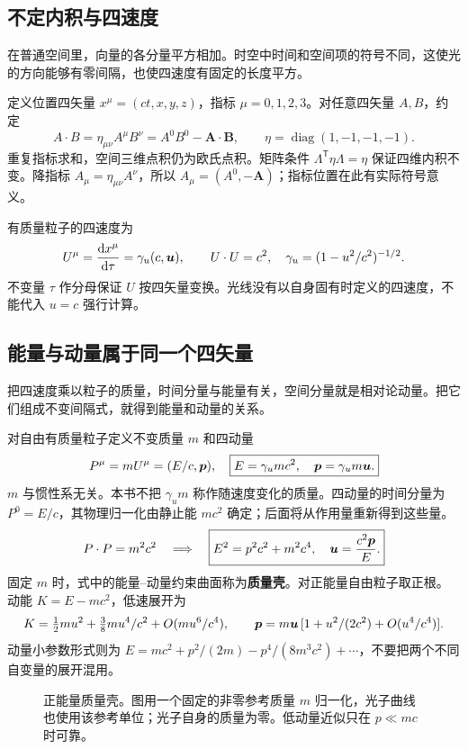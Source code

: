 \subsection{不定内积与四速度}
在普通空间里，向量的各分量平方相加。时空中时间和空间项的符号不同，这使光的方向能够有零间隔，也使四速度有固定的长度平方。

定义位置四矢量 $x^\mu=(ct,x,y,z)$，指标 $\mu=0,1,2,3$。对任意四矢量 $A,B$，约定
\[
A\cdot B=\eta_{\mu\nu}A^\mu B^\nu=A^0B^0-\boldsymbol{A}\cdot\boldsymbol{B},\qquad
\eta=\operatorname{diag}(1,-1,-1,-1).
\]
重复指标求和，空间三维点积仍为欧氏点积。矩阵条件 $\Lambda^{\mathsf T}\eta\Lambda=\eta$ 保证四维内积不变。降指标 $A_\mu=\eta_{\mu\nu}A^\nu$，所以 $A_\mu=(A^0,-\boldsymbol{A})$；指标位置在此有实际符号意义。

有质量粒子的四速度为
\[
U^\mu=\frac{\mathrm{d} x^\mu}{\mathrm{d}\tau}=\gamma_u(c,\boldsymbol{u}),\qquad U\cdot U=c^2,
\quad \gamma_u=(1-u^2/c^2)^{-1/2}.
\]
不变量 $\tau$ 作分母保证 $U$ 按四矢量变换。光线没有以自身固有时定义的四速度，不能代入 $u=c$ 强行计算。

\subsection{能量与动量属于同一个四矢量}
把四速度乘以粒子的质量，时间分量与能量有关，空间分量就是相对论动量。把它们组成不变间隔式，就得到能量和动量的关系。

对自由有质量粒子定义不变质量 $m$ 和四动量
\begin{equation}\label{eq:sr-p4}
P^\mu=mU^\mu=(E/c,\boldsymbol{p}),\quad
\boxed{E=\gamma_umc^2,\quad \boldsymbol{p}=\gamma_um\boldsymbol{u}.}
\end{equation}
$m$ 与惯性系无关。本书不把 $\gamma_um$ 称作随速度变化的质量。四动量的时间分量为 $P^0=E/c$，其物理归一化由静止能 $mc^2$ 确定；后面将从作用量重新得到这些量。
\begin{equation}\label{eq:sr-mass-shell}
P\cdot P=m^2c^2\quad\Longrightarrow\quad
\boxed{E^2=p^2c^2+m^2c^4,\quad\boldsymbol{u}=\frac{c^2\boldsymbol{p}}{E}.}
\end{equation}
固定 $m$ 时，式中的能量--动量约束曲面称为\textbf{质量壳}。对正能量自由粒子取正根。动能 $K=E-mc^2$，低速展开为
\[
K=\tfrac12mu^2+\tfrac38mu^4/c^2+O(mu^6/c^4),\qquad
\boldsymbol{p}=m\boldsymbol{u}\,[1+u^2/(2c^2)+O(u^4/c^4)].
\]
动量小参数形式则为 $E=mc^2+p^2/(2m)-p^4/(8m^3c^2)+\cdots$，不要把两个不同自变量的展开混用。

\begin{figure}[htbp]\centering
{}
\caption{正能量质量壳。图用一个固定的非零参考质量 $m$ 归一化，光子曲线也使用该参考单位；光子自身的质量为零。低动量近似只在 $p\ll mc$ 时可靠。}\label{fig:sr-mass-shell}
\end{figure}

